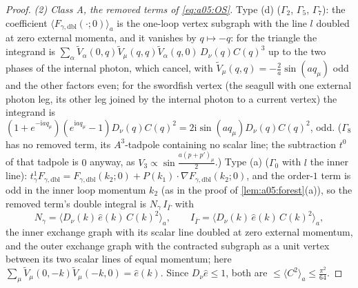 \begin{proof}
\emph{(2) Class A, the removed terms of \eqref{eq:a05:OS}.} Type (d) ($\Gamma_2$, $\Gamma_5$, $\Gamma_7$): the coefficient $\langle F_{\gamma,\mathrm{dbl}}(\cdot;0)\rangle_a$ is the one-loop vertex subgraph with the line $l$ doubled at zero external momenta, and it vanishes by $q\mapsto-q$: for the triangle the integrand is $\sum_\alpha\tilde V_\alpha(0,q)\tilde V_\mu(q,q)\tilde V_\alpha(q,0)\,D_\nu(q)C(q)^3$ up to the two phases of the internal photon, which cancel, with $\tilde V_\mu(q,q)=-\frac2a\sin(aq_\mu)$ odd and the other factors even; for the swordfish vertex (the seagull with one external photon leg, its other leg joined by the internal photon to a current vertex) the integrand is $(1+e^{-\mathrm iaq_\mu})(e^{\mathrm iaq_\mu}-1)D_\nu(q)C(q)^2=2\mathrm i\sin(aq_\mu)D_\nu(q)C(q)^2$, odd. ($\Gamma_8$ has no removed term, its $A^3$-tadpole containing no scalar line; the subtraction $t^0$ of that tadpole is $0$ anyway, as $V_3\propto\sin\frac{a(p+p')_\mu}2$.) Type (a) ($\Gamma_0$ with $l$ the inner line): $t^1_\gamma F_{\gamma,\mathrm{dbl}}=F_{\gamma,\mathrm{dbl}}(k_2;0)+P(k_1)\cdot\nabla F_{\gamma,\mathrm{dbl}}(k_2;0)$, and the order-$1$ term is odd in the inner loop momentum $k_2$ (as in the proof of \cref{lem:a05:forest}(a)), so the removed term's double integral is $N_\gamma\,I_{\bar\Gamma}$ with
\[
N_\gamma=\big\langle D_\nu(k)\,\hat e(k)\,C(k)^2\big\rangle_a,\qquad I_{\bar\Gamma}=\big\langle D_\nu(k)\,\hat e(k)\,C(k)^2\big\rangle_a,
\]
the inner exchange graph with its scalar line doubled at zero external momentum, and the outer exchange graph with the contracted subgraph as a unit vertex between its two scalar lines of equal momentum; here $\sum_\mu\tilde V_\mu(0,-k)\tilde V_\mu(-k,0)=\hat e(k)$. Since $D_\nu\hat e\le1$, both are $\le\langle C^2\rangle_a\le\frac{\pi^2}{64}$.


\end{proof}
